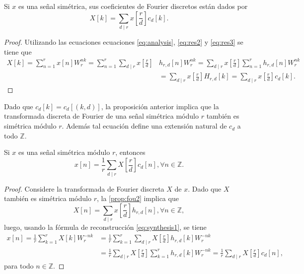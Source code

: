 \begin{proposition}\label{prop:fou4}
Si $x$ es una señal simétrica, sus coeficientes de Fourier discretos están dados por
\begin{equation*}
   X[k] = \sum_{d \mid r} x \left[ \frac{r}{d} \right] c_d[k].
\end{equation*}
\end{proposition}

\begin{proof}
Utilizando las ecuaciones ecuaciones \eqref{eq:analysis}, \eqref{eq:res2} y \eqref{eq:res3} se tiene que
\begin{align*}
    X[k] = \sum_{n=1}^{r} x[n] W_r^{n k} = \sum_{n=1}^{r} \sum_{d \mid r} x \left[ \frac{r}{d} \right] & h_{r,d}[n] W_r^{n k} = \sum_{d \mid r}x \left[ \frac{r}{d} \right] \sum_{n=1}^{r} h_{r,d}[n] W_r^{n k} \\
                                         & = \sum_{d \mid r} x \left[ \frac{r}{d} \right] H_{r,d}[k] = \sum_{d \mid r} x \left[ \frac{r}{d} \right] c_d[k].
\end{align*}
\end{proof}

\begin{remark}
Dado que $c_d[k] = c_d[(k,d)]$, la proposición anterior implica que la transformada discreta de Fourier de una señal simétrica módulo $r$ también es simétrica módulo $r$. Además tal ecuación define una extensión natural de $c_d$ a todo $\mathbb{Z}$.
\end{remark}

\begin{proposition}
Si $x$ es una señal simétrica módulo $r$, entonces
\begin{equation*}
    x[n] = \frac{1}{r} \sum_{d \mid r} X \left[ \frac{r}{d} \right] c_d[n], \forall n \in \mathbb{Z}.
\end{equation*}
\end{proposition}

\begin{proof}
Considere la transformada de Fourier discreta $X$ de $x$. Dado que $X$ también es simétrica módulo $r$, la \cref{prop:fou2} implica que
\begin{equation*}
    X[n] = \sum_{d \mid r} x \left[ \frac{r}{d} \right] h_{r,d}[n], \forall n \in \mathbb{Z},
\end{equation*}
luego, usando la fórmula de reconstrucción \eqref{eq:synthesis1}, se tiene
\begin{align*}
    x[n] = \frac{1}{r} \sum_{k=1}^{r} X[k] W_r^{-n k} & = \frac{1}{r} \sum_{k=1}^{r} \sum_{d \mid r} X \left[ \frac{r}{d} \right] h_{r,d} [k] W_r^{-n k} \\
         & = \frac{1}{r} \sum_{d \mid r} X \left[ \frac{r}{d} \right] \sum_{k=1}^{r} h_{r,d}[k] W_r^{-n k} = \frac{1}{r} \sum_{d \mid r} X \left[ \frac{r}{d} \right] c_d[n],
\end{align*}
para todo $n \in \mathbb{Z}$.
\end{proof}

